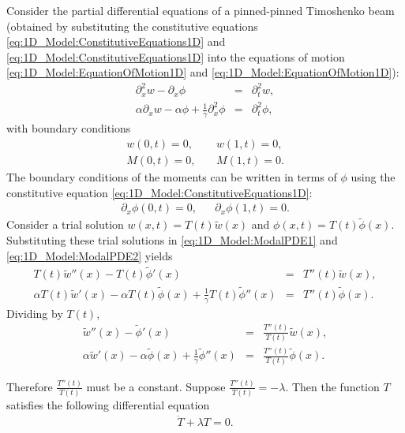 \documentclass[../../main.tex]{subfiles}
\begin{document}
Consider the partial differential equations of a pinned-pinned Timoshenko beam (obtained by substituting the constitutive equations \eqref{eq:1D_Model:ConstitutiveEquations1D} and \eqref{eq:1D_Model:ConstitutiveEquations1D} into the equations of motion \eqref{eq:1D_Model:EquationOfMotion1D} and \eqref{eq:1D_Model:EquationOfMotion1D}):
\begin{eqnarray}
	  \partial^2_{x} w - \partial_{x}\phi &=& \partial^{2}_{t} w, \label{eq:1D_Model:ModalPDE1}\\
	  \alpha\partial_{x} w - \alpha\phi + \frac{1}{\gamma}\partial^2_{x}\phi &=&  \partial^{2}_{t} \phi,\label{eq:1D_Model:ModalPDE2}
\end{eqnarray}
with boundary conditions
\begin{eqnarray*}
	w(0,t) = 0, & &	\	 w(1,t) = 0, \label{eq:1D_Model:ModalBC1}\\
	M(0,t) = 0, & &	\	M(1,t) = 0. \label{eq:1D_Model:ModalBC2}
\end{eqnarray*}
The boundary conditions of the moments can be written in terms of $\phi$ using the constitutive equation \eqref{eq:1D_Model:ConstitutiveEquations1D}:
\begin{eqnarray*}
	\partial_{x}\phi(0,t) = 0, & & \partial_{x}\phi(1,t) = 0. \label{MA_4}
\end{eqnarray*}
Consider a trial solution $w(x,t) = T(t)\tilde{w}(x)$ and $\phi(x,t) = T(t)\tilde{\phi}(x)$. Substituting these trial solutions in \eqref{eq:1D_Model:ModalPDE1} and \eqref{eq:1D_Model:ModalPDE2} yields
\begin{eqnarray*}
	T(t)\tilde{w}''(x) - T(t)\tilde{\phi}'(x) &=& T''(t)\tilde{w}(x),\\
	  \alpha T(t)\tilde{w}'(x) - \alpha T(t)\tilde{\phi}(x) + \frac{1}{\gamma}T(t)\tilde{\phi}''(x) &=&  T''(t)\tilde{\phi}(x).
\end{eqnarray*}
Dividing by $T(t)$,
\begin{eqnarray*}
	\tilde{w}''(x) - \tilde{\phi}'(x) &=& \frac{T''(t)}{T(t)}\tilde{w}(x),\\
	  \alpha \tilde{w}'(x) - \alpha \tilde{\phi}(x) + \frac{1}{\gamma}\tilde{\phi}''(x) &=&  \frac{T''(t)}{T(t)}\tilde{\phi}(x).
\end{eqnarray*}

Therefore $\displaystyle \frac{T''(t)}{T(t)}$ must be a constant. Suppose $\displaystyle \frac{T''(t)}{T(t)} = -\lambda$. Then the function $T$ satisfies the following differential equation
\begin{eqnarray}
	\ddot{T} + \lambda T = 0. \label{eq:1D_Model:ModalAnalysisT}
\end{eqnarray}
\end{document}
